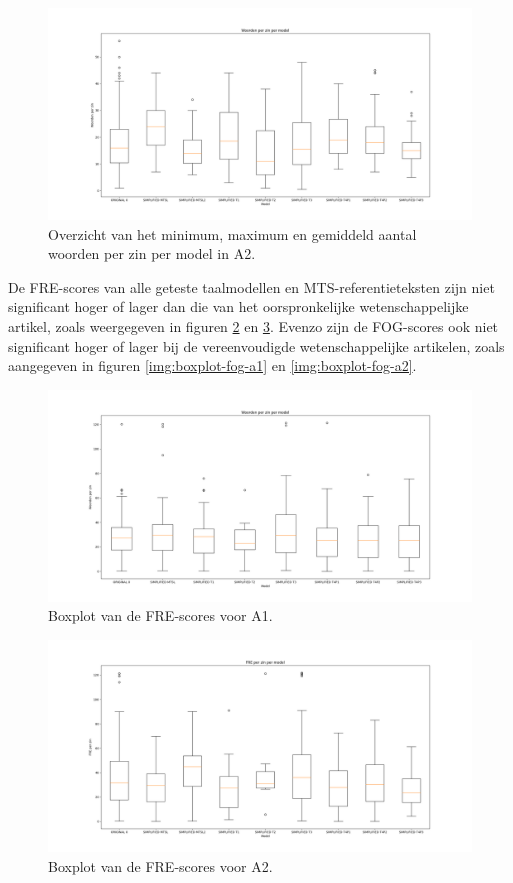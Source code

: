 \begin{figure}
	\includegraphics[width=\linewidth]{img/boxplot-avg-a2.png}
	\caption{Overzicht van het minimum, maximum en gemiddeld aantal woorden per zin per model in A2.}
	\label{img:boxplot-min-max-avg-words-a2}
\end{figure}

De FRE-scores van alle geteste taalmodellen en MTS-referentieteksten zijn niet significant hoger of lager dan die van het oorspronkelijke wetenschappelijke artikel, zoals weergegeven in figuren \ref{img:boxplot-fre-a1} en \ref{img:boxplot-fre-a2}. Evenzo zijn de FOG-scores ook niet significant hoger of lager bij de vereenvoudigde wetenschappelijke artikelen, zoals aangegeven in figuren \ref{img:boxplot-fog-a1} en \ref{img:boxplot-fog-a2}. 


\begin{figure}
	\includegraphics[width=\linewidth]{img/boxplot-fre-a1.png}
	\caption{Boxplot van de FRE-scores voor A1.}
	\label{img:boxplot-fre-a1}
\end{figure}

\begin{figure}
	\includegraphics[width=\linewidth]{img/boxplot-fre-a2.png}
	\caption{Boxplot van de FRE-scores voor A2.}
	\label{img:boxplot-fre-a2}
\end{figure}

